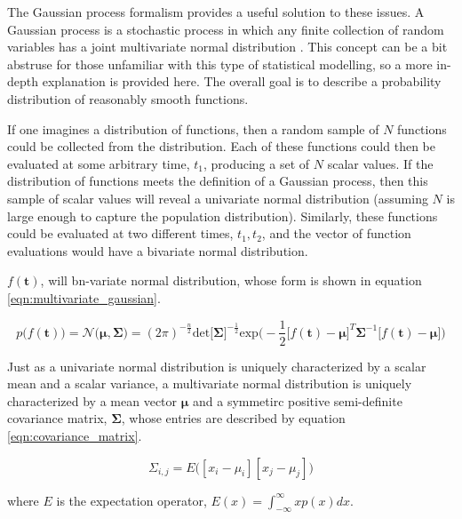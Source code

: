 \documentclass{article}
\begin{document}
The Gaussian process formalism provides a useful solution to these issues. A Gaussian process is a stochastic process in which any finite collection of random variables has a joint multivariate normal distribution \cite{lee2017deep}. This concept can be a bit abstruse for those unfamiliar with this type of statistical modelling, so a more in-depth explanation is provided here. The overall goal is to describe a probability distribution of reasonably smooth functions. 



If one imagines a distribution of functions, then a random sample of $N$ functions could be collected from the distribution. Each of these functions could then be evaluated at some arbitrary time, $t_1$, producing a set of $N$ scalar values. If the distribution of functions meets the definition of a Gaussian process, then this sample of scalar values will reveal a univariate normal distribution (assuming $N$ is large enough to capture the population distribution). Similarly, these functions could be evaluated at two different times, $t_1, t_2$, and the vector of function evaluations would have a bivariate normal distribution. 


$f(\boldsymbol{t})$, will bn-variate normal distribution, whose form is shown in equation \ref{eqn:multivariate_gaussian}.

 \begin{equation}
  \label{eqn:multivariate_gaussian}
  p\bigg(f(\boldsymbol{t}) \bigg) = \mathcal{N}\Big(\boldsymbol{\mu}, \boldsymbol{\Sigma} \Big) = 
  (2\pi)^{-\frac{n}{2}}\text{det}\big[\boldsymbol{\Sigma}\big]^{-\frac{1}{2}}\text{exp}\bigg(-\frac{1}{2}\big[f(\boldsymbol{t}) - \boldsymbol{\mu}\big]^T \boldsymbol{\Sigma}^{-1}\big[f(\boldsymbol{t}) - \boldsymbol{\mu}\big] \bigg)
\end{equation}

Just as a univariate normal distribution is uniquely characterized by a scalar mean and a scalar variance, a multivariate normal distribution is uniquely characterized by a mean vector $\boldsymbol{\mu}$ and a symmetirc positive semi-definite covariance matrix, $\boldsymbol{\Sigma}$, whose entries are described by equation \ref{eqn:covariance_matrix}.

 \begin{equation}
  \label{eqn:covariance_matrix}
  \Sigma_{i,j} = E\bigg([x_i- \mu_i][x_j - \mu_j] \bigg)
\end{equation}

\noindent where $E$ is the expectation operator, $E(x) =  \int_{-\infty}^{\infty} xp(x) dx$.
\end{document}
